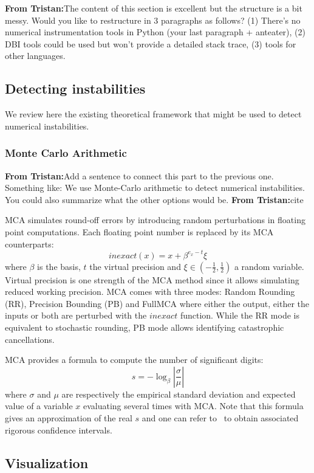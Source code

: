 \documentclass[11pt]{article}
\newcommand{\tristan}[1]{\color{orange}\textbf{From Tristan:}#1\color{black}}
\begin{document}
\tristan{The content of this section is excellent but the structure is a bit messy. Would you like to restructure in 3 paragraphs as follows? (1) There's no numerical instrumentation tools in Python (your last paragraph + anteater), (2) DBI tools could be used but won't provide a detailed stack trace, (3) tools for other languages.}

\subsection{Detecting instabilities}

We review here the existing theoretical framework that might be used to detect numerical instabilities.


\label{sec:mca}
\subsubsection{Monte Carlo Arithmetic}
\tristan{Add a sentence to connect this part to the previous one. Something like: We use Monte-Carlo arithmetic to detect numerical instabilities. You could also summarize what the other options would be.} \tristan{cite \cite{parker1997monte}}

MCA simulates round-off errors by introducing random perturbations in floating point computations. Each floating point number is replaced by its MCA counterparts:
\[
inexact(x) =  x + \beta^{e_x - t}\xi
\]
where $\beta$ is the basis, $t$ the virtual precision and $\xi \in (-\frac{1}{2},\frac{1}{2})$ a random variable.
Virtual precision is one strength of the MCA method since it allows simulating 
reduced working precision.
MCA comes with three modes: Random Rounding (RR), Precision Bounding (PB) and FullMCA where either the output, either the inputs or both are perturbed with the $inexact$ function.
While the RR mode is equivalent to stochastic rounding, PB mode allows identifying 
catastrophic cancellations.

MCA provides a formula to compute the number of significant digits:
\[
s = -\log_{\beta}{ \left| \dfrac{\sigma}{\mu} \right|}
\]
where $\sigma$ and $\mu$ are respectively the empirical standard deviation and expected value of a variable $x$ evaluating several times with MCA. 
Note that this formula gives an approximation of the real $s$ and 
one can refer to~\cite{sohier2018confidence} to obtain associated rigorous confidence intervals.

\subsection{Visualization}
\end{document}
